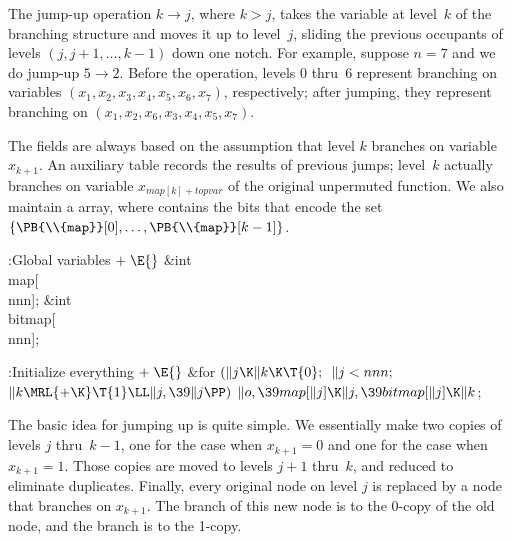 The jump-up operation $k\to j$, where $k>j$, takes the variable
at level~$k$ of the branching structure and moves it up to level~$j$,
sliding the previous occupants of levels $(j,j+1,\ldots,k-1)$
down one notch. For example, suppose $n=7$ and we do jump-up $5\to2$.
Before the operation, levels 0 thru~6 represent branching on
variables $(x_1,x_2,x_3,x_4,x_5,x_6,x_7)$, respectively; after jumping, they
represent branching on $(x_1,x_2,x_6,x_3,x_4,x_5,x_7)$.

The  fields are always based on the assumption that level $k$
branches
on variable $x_{k+1}$. An auxiliary  table records the results of
previous jumps; level~$k$ actually branches on variable
$x_{map[k]+topvar}$ of the original unpermuted function. We also maintain
a  array, where  contains the bits that
encode the set
$\{\PB{\\{map}}[0],\ldots,\PB{\\{map}}[k-1]\}$.

\Y\B\4:Global variables\X${}\mathrel+\E{}$\6
\&{int} \\{map}[\\{nnn}];\6
\&{int} \\{bitmap}[\\{nnn}];\par
\fi

\B{}:Initialize everything\X${}\mathrel+\E{}$\6
\&{for} ${}(\|j\K\|k\K\T{0};{}$ ${}\|j<\\{nnn};{}$ ${}\|k\MRL{+{\K}}\T{1}\LL%
\|j,\39\|j\PP){}$\1\5
${}\|o,\39\\{map}[\|j]\K\|j,\39\\{bitmap}[\|j]\K\|k{}$;\2\par
\fi

The basic idea for jumping up is quite simple. We
essentially make
two copies of levels $j$ thru~$k-1$, one for the case when $x_{k+1}=0$
and one for the case when $x_{k+1}=1$. Those copies are moved to
levels $j+1$ thru~$k$, and reduced to eliminate duplicates.
Finally, every original node on level $j$ is replaced by a node
that branches on $x_{k+1}$. The  branch of this new node is
to the 0-copy of the old node, and the  branch is to the 1-copy.

